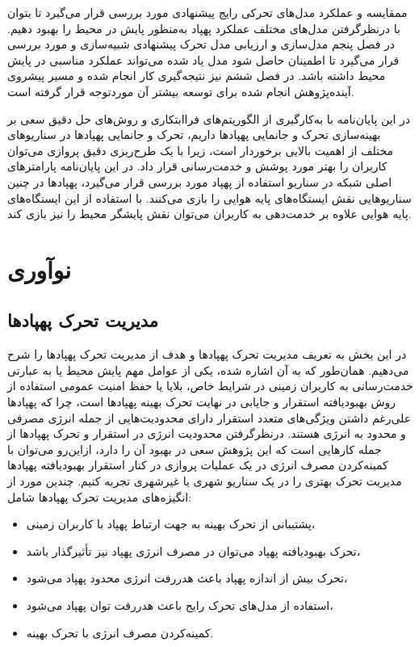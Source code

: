 ممقایسه و عملکرد مدل‌های تحرکی رایج پیشنهادی مورد بررسی قرار می‌گیرد تا بتوان با درنظرگرفتن مدل‌های مختلف عملکرد پهپاد به‌منظور پایش در محیط را بهبود دهیم. در فصل پنجم مدل‌سازی و ارزیابی مدل تحرک پیشنهادی شبیه‌سازی و مورد بررسی قرار می‌گیرد تا اطمینان حاصل شود مدل یاد شده می‌تواند عملکرد مناسبی در پایش محیط داشته باشد. در فصل ششم نیز نتیجه‌گیری کار انجام شده و مسیر پیشروی آینده‌پژوهش انجام شده برای توسعه بیشتر آن موردتوجه قرار گرفته است.


در این پایان‌نامه با به‌کارگیری از الگوریتم‌های فراابتکاری و روش‌های حل دقیق سعی بر بهینه‌سازی تحرک و جانمایی پهپادها داریم، تحرک و جانمایی پهپادها در سناریوهای مختلف از اهمیت بالایی برخوردار است، زیرا با یک طرح‌ریزی دقیق پروازی می‌توان کاربران را بهتر مورد پوشش و خدمت‌رسانی قرار داد. در این پایان‌نامه پارامترهای اصلی شبکه در سناریو استفاده از پهپاد مورد بررسی قرار می‌گیرد، پهپادها در چنین سناریوهایی نقش ایستگاه‌های پایه هوایی را بازی می‌کنند. با استفاده از این ایستگاه‌های پایه هوایی علاوه بر خدمت‌دهی به کاربران می‌توان نقش پایشگر محیط را نیز بازی کند.

\section{نوآوری}
	\subsection{مدیریت تحرک پهپادها} \label{Chapter1Section1} 

در این بخش به تعریف مدیریت تحرک پهپادها و هدف از مدیریت تحرک پهپادها را شرح می‌دهیم. همان‌طور که به آن اشاره شده، یکی از عوامل مهم پایش محیط یا به عبارتی خدمت‌رسانی به کاربران زمینی در شرایط خاص، بلایا یا حفظ امنیت عمومی استفاده از روش بهبودیافته استقرار و جایابی در نهایت تحرک بهینه پهپادها است، چرا که پهپادها علی‌رغم داشتن ویژگی‌های متعدد استقرار دارای محدودیت‌هایی از جمله انرژی مصرفی و محدود به انرژی هستند. درنظرگرفتن محدودیت انرژی در استقرار و تحرک پهپادها از جمله کارهایی است که این پژوهش سعی در بهبود آن را دارد، ازاین‌رو می‌توان با کمینه‌کردن مصرف انرژی در یک عملیات پروازی در کنار استقرار بهبودیافته پهپادها مدیریت تحرک بهتری را در یک سناریو شهری یا غیرشهری تجربه کنیم. چندین مورد از انگیزه‌های مدیریت تحرک پهپادها شامل: 
\begin{itemize} 
	
	\item 
	پشتیبانی از تحرک بهینه به جهت ارتباط پهپاد با کاربران زمینی، 
	\item 
	تحرک بهبودیافته پهپاد می‌توان در مصرف انرژی پهپاد نیز تأثیرگذار باشد، 
	\item 
	تحرک بیش از اندازه پهپاد باعث هدررفت انرژی محدود پهپاد می‌شود، 
	\item 
	استفاده از مدل‌های تحرک رایج باعث هدررفت توان پهپاد می‌شود، 
	\item 
	کمینه‌کردن مصرف انرژی با تحرک بهینه.
\end{itemize} 

